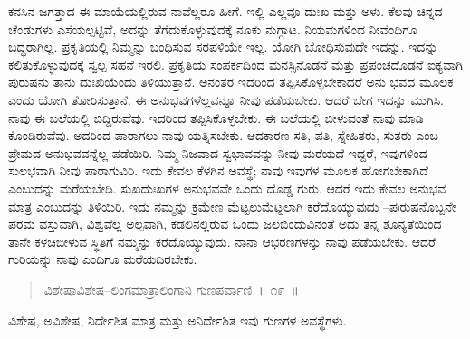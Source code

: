 ಕನಸಿನ ಜಗತ್ತಾದ ಈ ಮಾಯೆಯಲ್ಲಿರುವ ನಾವೆಲ್ಲರೂ ಹೀಗೆ. ಇಲ್ಲಿ ಎಲ್ಲವೂ ದುಃಖ ಮತ್ತು ಅಳು. ಕೆಲವು ಚಿನ್ನದ ಚೆಂಡುಗಳು ಎಸೆಯಲ್ಪಟ್ಟಿವೆ, ಅದನ್ನು ತೆಗೆದುಕೊಳ್ಳುವುದಕ್ಕೆ ನೂಕು ನುಗ್ಗಾಟ. ನಿಯಮಗಳಿಂದ ನೀವೆಂದಿಗೂ ಬದ್ಧರಾಗಿಲ್ಲ. ಪ್ರಕೃತಿಯಲ್ಲಿ ನಿಮ್ಮನ್ನು ಬಂಧಿಸುವ ಸರಪಳಿಯೇ ಇಲ್ಲ. ಯೋಗಿ ಬೋಧಿಸುವುದೇ ಇದನ್ನು. ಇದನ್ನು ಕಲಿತುಕೊಳ್ಳುವುದಕ್ಕೆ ಸ್ವಲ್ಪ ಸಹನೆ ಇರಲಿ. ಪ್ರಕೃತಿಯ ಸಂಪರ್ಕದಿಂದ ಮನಸ್ಸಿನೊಡನೆ ಮತ್ತು ಪ್ರಪಂಚದೊಡನೆ ಐಕ್ಯವಾಗಿ ಪುರುಷನು ತಾನು ದುಃಖಿಯೆಂದು ತಿಳಿಯುತ್ತಾನೆ. ಅನಂತರ ಇದರಿಂದ ತಪ್ಪಿಸಿಕೊಳ್ಳಬೇಕಾದರೆ ಅನು ಭವದ ಮೂಲಕ ಎಂದು ಯೋಗಿ ತೋರಿಸುತ್ತಾನೆ. ಈ ಅನುಭವಗಳೆಲ್ಲವನ್ನೂ ನೀವು ಪಡೆಯಬೇಕು. ಆದರೆ ಬೇಗ ಇದನ್ನು ಮುಗಿಸಿ. ನಾವು ಈ ಬಲೆಯಲ್ಲಿ ಬಿದ್ದಿರುವೆವು. ಇದರಿಂದ ತಪ್ಪಿಸಿಕೊಳ್ಳಬೇಕು. ಈ ಬಲೆಯಲ್ಲಿ ಬೀಳುವಂತೆ ನಾವು ಮಾಡಿ ಕೊಂಡಿರುವೆವು. ಅದರಿಂದ ಪಾರಾಗಲು ನಾವು ಯತ್ನಿಸಬೇಕು. ಆದಕಾರಣ ಸತಿ, ಪತಿ, ಸ್ನೇಹಿತರು, ಸುತರು ಎಂಬ ಪ್ರೇಮದ ಅನುಭವವನ್ನೆಲ್ಲ ಪಡೆಯಿರಿ. ನಿಮ್ಮ ನಿಜವಾದ ಸ್ವಭಾವವನ್ನು ನೀವು ಮರೆಯದೆ ಇದ್ದರೆ, ಇವುಗಳಿಂದ ಸುಲಭವಾಗಿ ನೀವು ಪಾರಾಗುವಿರಿ. ಇದು ಕೇವಲ ಕೆಳಗಿನ ಅವಸ್ಥೆ; ನಾವು ಇವುಗಳ ಮೂಲಕ ಹೋಗಬೇಕಾಗಿದೆ ಎಂಬುದನ್ನು ಮರೆಯಬೇಡಿ. ಸುಖದುಃಖಗಳ ಅನುಭವವೇ ಒಂದು ದೊಡ್ಡ ಗುರು. ಆದರೆ ಇದು ಕೇವಲ ಅನುಭವ ಮಾತ್ರ ಎಂಬುದನ್ನು ತಿಳಿಯಿರಿ. ಇದು ನಮ್ಮನ್ನು ಕ್ರಮೇಣ ಮೆಟ್ಟಲುಮೆಟ್ಟಲಾಗಿ ಕರೆದೊಯ್ಯುವುದು –ಪುರುಷನೊಬ್ಬನೇ ಪರಮ ವಸ್ತುವಾಗಿ, ವಿಶ್ವವೆಲ್ಲ ಅಲ್ಪವಾಗಿ, ಕಡಲಿನಲ್ಲಿರುವ ಒಂದು ಜಲಬಿಂದುವಿನಂತೆ ಅದು ತನ್ನ ಶೂನ್ಯತೆಯಿಂದ ತಾನೇ ಕಳಚಿಬೀಳುವ ಸ್ಥಿತಿಗೆ ನಮ್ಮನ್ನು ಕರೆದೊಯ್ಯುವುದು. ನಾನಾ ಆಭರಣಗಳನ್ನು ನಾವು ಪಡೆಯಬೇಕು. ಆದರೆ ಗುರಿಯನ್ನು ನಾವು ಎಂದಿಗೂ ಮರೆಯದಿರಬೇಕು. 

\vspace{-0.3cm}

\begin{verse}
ವಿಶೇಷಾವಿಶೇಷ–ಲಿಂಗಮಾತ್ರಾಲಿಂಗಾನಿ ಗುಣಪರ್ವಾಣಿ~॥ ೧೯~॥
\end{verse}

\vspace{-0.3cm}

ವಿಶೇಷ, ಅವಿಶೇಷ, ನಿರ್ದೇಶಿತ ಮಾತ್ರ ಮತ್ತು ಅನಿರ್ದೇಶಿತ ಇವು ಗುಣಗಳ ಅವಸ್ಥೆಗಳು. 

